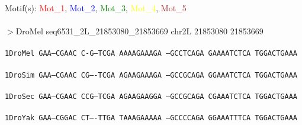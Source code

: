 \documentclass[11pt,twoside,reqno,a4paper]{article}
\begin{document}
\noindent
\newlength{\charwidth}Motif(s): \textcolor{Red}{Mot\_1}, \textcolor{Blue}{Mot\_2}, \textcolor{Green}{Mot\_3}, \textcolor{Yellow}{Mot\_4}, \textcolor{Brown}{Mot\_5}\\
\\
$>$DroMel	seq6531\_2L\_21853080\_21853669	chr2L	21853080	21853669 \\
 \\
\texttt{1\hspace*{3\charwidth}DroMel	GAA--CGAAC	C-G---TCGA	AAAAGAAAGA	--GCCTCAGA	GAAAATCTCA	TGGACTGAAA	\\
\hspace*{4\charwidth}\hspace*{7\charwidth}\hspace*{1\charwidth}\hspace*{1\charwidth}\hspace*{1\charwidth}\hspace*{1\charwidth}\hspace*{1\charwidth}\hspace*{1\charwidth}\\
1\hspace*{3\charwidth}DroSim	GAA--CGAAC	CG----TCGA	AGAAGAAAGA	--GCCGCAGA	GGAAATCTCA	TGGACTGAAA	\\
\hspace*{4\charwidth}\hspace*{7\charwidth}\hspace*{1\charwidth}\hspace*{1\charwidth}\hspace*{1\charwidth}\hspace*{1\charwidth}\hspace*{1\charwidth}\hspace*{1\charwidth}\\
1\hspace*{3\charwidth}DroSec	GAA--CGAAC	CCG---TCGA	AGAAGAAGGA	--GCCGCAGA	CGAAATCTCA	TGGACTGAAA	\\
\hspace*{4\charwidth}\hspace*{7\charwidth}\hspace*{1\charwidth}\hspace*{1\charwidth}\hspace*{1\charwidth}\hspace*{1\charwidth}\hspace*{1\charwidth}\hspace*{1\charwidth}\\
1\hspace*{3\charwidth}DroYak	GAA--CGGAC	CT----TTGA	TAAAGAAAAA	--GCCCCAGA	GGAAATTTCA	TGGACTGAAA	\\
}
\end{document}
